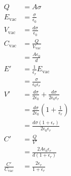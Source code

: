 \documentclass{article}
\begin{document}
\begin{align*}
  Q                       & = A \sigma                                                                 \\
  E_\text{vac}            & = \frac{\sigma}{\epsilon_0}                                                \\
  V_\text{vac}            & = \frac{d \sigma}{\epsilon_0}                                              \\
  C_\text{vac}            & = \frac{Q}{V_\text{vac}}                                                   \\
                          & = \frac{A \epsilon_0}{d}                                                   \\
  E'                      & = \frac{1}{\epsilon_r} E_\text{vac}                                        \\
                          & = \frac{\sigma}{\epsilon_0 \epsilon_r}                                     \\
  V'                      & = \frac{d \sigma}{2 \epsilon_0} + \frac{d \sigma}{2 \epsilon_0 \epsilon_r} \\
                          & = \frac{d \sigma}{2 \epsilon_0} \left( 1 + \frac{1}{\epsilon_r} \right)    \\
                          & = \frac{d \sigma (1 + \epsilon_r)}{2 \epsilon_0 \epsilon_r}                \\
  C'                      & = \frac{Q}{V'}                                                             \\
                          & = \frac{2 A \epsilon_0 \epsilon_r}{d (1 + \epsilon_r)}                     \\
  \frac{C'}{C_\text{vac}} & = \frac{2 \epsilon_r}{1 + \epsilon_r}
\end{align*}
\end{document}
